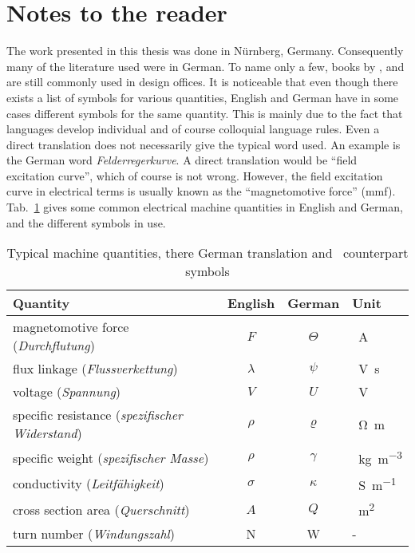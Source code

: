 \section{Notes to the reader}
The work presented in this thesis was done in Nürnberg, Germany. Consequently many of the literature used were in German. To name only a few, books by \cite{REF-00004}, \cite{REF-00429} and \cite{REF-00294} are still commonly used in design offices. It is noticeable that even though there exists a list of symbols for various quantities, English and German have in some cases different symbols for the same quantity. This is mainly due to the fact that languages develop individual and of course colloquial language rules. Even a direct translation does not necessarily give the typical word used. An example is the German word \textit{Felderregerkurve}. A direct translation would be ``field excitation curve'', which of course is not wrong. However, the field excitation curve in electrical terms is usually known as the ``magnetomotive force'' (mmf). Tab.~\ref{tab:translation} gives some common electrical machine quantities in English and German, and the different symbols in use.
\begin{table}[htbp]
	\caption[Typical machine quantities and their German translation]%
	{Typical machine quantities, there German translation and~%
	counterpart symbols}
	\label{tab:translation}
	\centering
	\begin{tabular}{lccl}
	\toprule
	Quantity   &  English  & German & Unit \\
	\toprule
	magnetomotive force (\textit{Durchflutung}) & 
	$F$& $\Theta$ & \SI{}{A}\\
	\midrule
	flux linkage (\textit{Flussverkettung}) & 
	$\lambda$& $\psi$ & \SI{}{V.s}   \\
	\midrule
	voltage (\textit{Spannung})  & 
	$V$& $U$ & \SI{}{V} \\
	\midrule
	specific resistance (\textit{spezifischer Widerstand})&
	$\rho$& $\varrho$ & \SI{}{\ohm.m} \\
	\midrule
	specific weight (\textit{spezifischer Masse})&
	$\rho$& $\gamma$& \SI{}{kg.m^{-3}}\\
	\midrule
	conductivity (\textit{Leitfähigkeit})&
	$\sigma$&$\kappa$& \SI{}{S.m^{-1}}\\
	\midrule
	cross section area (\textit{Querschnitt})&
	$A$&$Q$& \SI{}{m^{2}}\\
	\midrule
	turn number (\textit{Windungszahl}) & 
	N& W & - \\
	\bottomrule
	\end{tabular}
\end{table}


